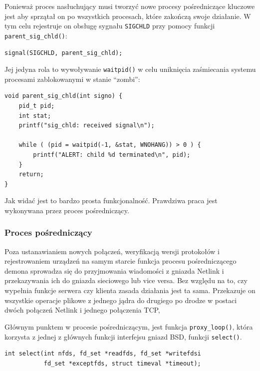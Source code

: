 \documentclass[11pt]{scrartcl}
\begin{document}
Ponieważ proces nasłuchujący musi tworzyć nowe procesy pośredniczące kluczowe jest aby sprzątał on po wszystkich procesach, które zakończą swoje działanie. W tym celu rejestruje on obsługę sygnału \texttt{SIGCHLD} przy pomocy funkcji \texttt{parent\_sig\_chld()}:

\begin{verbatim}
signal(SIGCHLD, parent_sig_chld);
\end{verbatim}

Jej jedyna rola to wywoływanie \texttt{waitpid()} w celu uniknięcia zaśmiecania systemu procesami zablokowanymi w stanie ``zombi'':

\begin{verbatim}
void parent_sig_chld(int signo) {
    pid_t pid;
    int stat;
    printf("sig_chld: received signal\n");

    while ( (pid = waitpid(-1, &stat, WNOHANG)) > 0 ) {
        printf("ALERT: child %d terminated\n", pid);
    }
    return;
}
\end{verbatim}

Jak widać jest to bardzo prosta funkcjonalność. Prawdziwa praca jest wykonywana przez proces pośredniczący.

\subsubsection{Proces pośredniczący}

Poza ustanawianiem nowych połączeń, weryfikacją wersji protokołów i rejestrowaniem urządzeń na samym starcie funkcja procesu pośredniczącego demona sprowadza się do przyjmowania wiadomości z gniazda Netlink i przekazywania ich do gniazda sieciowego lub vice versa. Bez względu na to, czy wypełnia funkcje serwera czy klienta zasada działania jest ta sama. Przekazuje on wszystkie operacje plikowe z jednego jądra do drugiego po drodze w postaci dwóch połączeń Netlink i jednego połączenia TCP,

Głównym punktem w procesie pośredniczącym, jest funkcja \texttt{proxy\_loop()}, która korzysta z jednej z głównych funkcji interfejsu gniazd BSD, funkcji \texttt{select()}.

\begin{verbatim}
int select(int nfds, fd_set *readfds, fd_set *writefdsi
           fd_set *exceptfds, struct timeval *timeout);
\end{verbatim}
\end{document}
